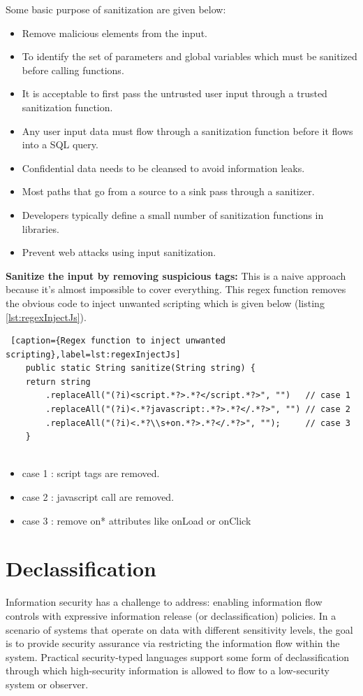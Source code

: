 Some basic purpose of sanitization are given below:
\begin{itemize}
	\item Remove malicious elements from the input.
	\item To identify the set of parameters and global variables which must be sanitized before calling functions.
	\item It is acceptable to first pass the untrusted user input through a trusted sanitization function.	
	\item Any user input data must flow through a sanitization function before it flows into a SQL query.
	\item Confidential data needs to be cleansed to avoid information leaks.
	\item Most paths that go from a source to a sink pass through a sanitizer.
	\item Developers typically define a small number of sanitization functions in libraries.
	\item Prevent web attacks using input sanitization.
\end{itemize}

\textbf{Sanitize the input by removing suspicious tags:}
This is a naive approach because it's almost impossible to cover everything. This regex function removes the obvious code to inject unwanted scripting which is given below (listing \ref{lst:regexInjectJs}).

\begin{lstlisting} [caption={Regex function to inject unwanted scripting},label=lst:regexInjectJs]
	public static String sanitize(String string) {
	return string
		.replaceAll("(?i)<script.*?>.*?</script.*?>", "")   // case 1
		.replaceAll("(?i)<.*?javascript:.*?>.*?</.*?>", "") // case 2
		.replaceAll("(?i)<.*?\\s+on.*?>.*?</.*?>", "");     // case 3
	}
	
\end{lstlisting}

\begin{itemize}
	\item case 1 : script tags are removed.
	\item case 2 : javascript call are removed.
	\item case 3 : remove on* attributes like onLoad or onClick
\end{itemize}

\section{Declassification}
Information security has a challenge to address: enabling information flow controls with expressive information release (or declassification) policies. In a scenario of systems that operate on data with different sensitivity levels, the goal is to provide security assurance via restricting the information flow within the system. Practical security-typed languages support some form of declassification through which high-security information is allowed to flow to a low-security system or observer.

